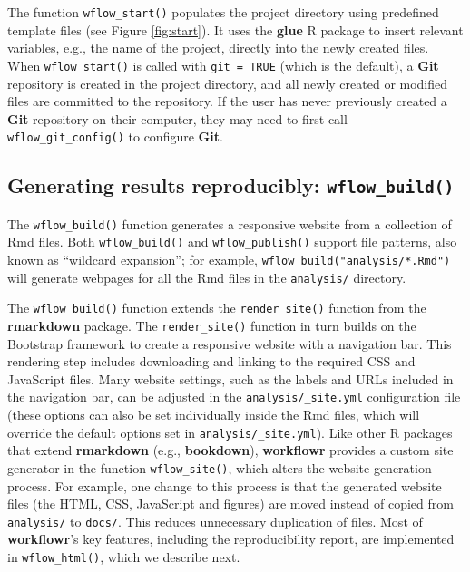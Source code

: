 \documentclass[9pt,a4paper]{extarticle}
\begin{document}
The function \texttt{wflow\_start()} populates the project directory using
predefined template files (see Figure \ref{fig:start}). It uses the \textbf{glue} \cite{glue} R
package to insert relevant variables, e.g., the name of the project,
directly into the newly created files. When \texttt{wflow\_start()} is called with
\texttt{git = TRUE} (which is the default), a \textbf{Git} repository is created
in the project directory, and all newly created or modified files are
committed to the repository. If the user has never previously created a
 \textbf{Git} repository on their computer, they may need to first call
\texttt{wflow\_git\_config()} to configure \textbf{Git}.

\subsection*{Generating results reproducibly: \texttt{wflow\_build()}}

The \texttt{wflow\_build()} function generates a responsive website from a
collection of Rmd files. Both \texttt{wflow\_build()} and \texttt{wflow\_publish()} support
file patterns, also known as “wildcard expansion”; for example,
\texttt{wflow\_build("analysis/*.Rmd")} will generate webpages for all
the Rmd files in the \texttt{analysis/} directory.

The \texttt{wflow\_build()} function extends the \texttt{render\_site()} function from the
 \textbf{rmarkdown} package. The \texttt{render\_site()} function in turn builds on the
Bootstrap framework to create a responsive website with a navigation
bar. This rendering step includes downloading and linking to the
required CSS and JavaScript files. Many website settings, such as the
labels and URLs included in the navigation bar, can be adjusted in the
\texttt{analysis/\_site.yml} configuration file (these options can also
be set individually inside the Rmd files, which will override the
default options set in \texttt{analysis/\_site.yml}). Like other R
packages that extend \textbf{rmarkdown} (e.g., \textbf{bookdown}), \textbf{workflowr} provides a
custom site generator in the function \texttt{wflow\_site()}, which alters the
website generation process. For example, one change to this process is
that the generated website files (the HTML, CSS, JavaScript and figures)
are moved instead of copied from \texttt{analysis/} to \texttt{docs/}. This
reduces unnecessary duplication of files. Most of \textbf{workflowr}’s key
features, including the reproducibility report, are implemented in
\texttt{wflow\_html()}, which we describe next.
\end{document}

